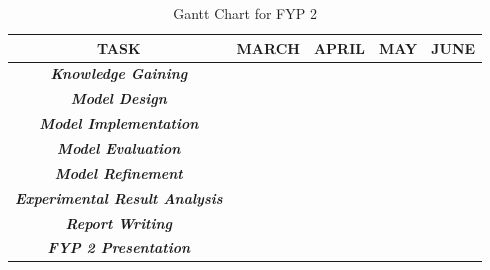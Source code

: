 \begin{table}[]
\begin{tabular}{|c|l|l|l|l|}
\hline
\textbf{TASK}                                  & \multicolumn{1}{c|}{\textbf{MARCH}}           & \multicolumn{1}{c|}{\textbf{APRIL}}           & \textbf{MAY}             & \textbf{JUNE}            \\ \hline
\textit{\textbf{Knowledge Gaining}}            & \multicolumn{1}{c|}{\cellcolor[HTML]{FFCB2F}} & \multicolumn{1}{c|}{\cellcolor[HTML]{FFCB2F}} & \cellcolor[HTML]{FFCB2F} & \cellcolor[HTML]{FFFFFF} \\ \hline
\textit{\textbf{Model Design}}                 & \cellcolor[HTML]{FFCB2F}                      & \cellcolor[HTML]{FFCB2F}                      & \cellcolor[HTML]{FFFFFF} & \cellcolor[HTML]{FFFFFF} \\ \hline
\textit{\textbf{Model Implementation}}         & \cellcolor[HTML]{FFCB2F}                      & \cellcolor[HTML]{FFCB2F}                      & \cellcolor[HTML]{FFFFFF} & \cellcolor[HTML]{FFFFFF} \\ \hline
\textit{\textbf{Model Evaluation}}             &                                               & \cellcolor[HTML]{FFFFFF}                      & \cellcolor[HTML]{FFCB2F} & \cellcolor[HTML]{FFCB2F} \\ \hline
\textit{\textbf{Model Refinement}}             &                                               & \cellcolor[HTML]{FFFFFF}                      & \cellcolor[HTML]{FFCB2F} & \cellcolor[HTML]{FFCB2F} \\ \hline
\textit{\textbf{Experimental Result Analysis}} &                                               & \cellcolor[HTML]{FFFFFF}                      & \cellcolor[HTML]{FFCB2F} & \cellcolor[HTML]{FFCB2F} \\ \hline
\textit{\textbf{Report Writing}}               & \cellcolor[HTML]{FFCB2F}                      & \cellcolor[HTML]{FFCB2F}                      & \cellcolor[HTML]{FFCB2F} & \cellcolor[HTML]{FFCB2F} \\ \hline
\textit{\textbf{FYP 2 Presentation}}           &                                               &                                               &                          & \cellcolor[HTML]{FFCB2F} \\ \hline
\end{tabular}
\caption{Gantt Chart for FYP 2}
\label{tab:gantt-chart-fyp2}
\end{table}

